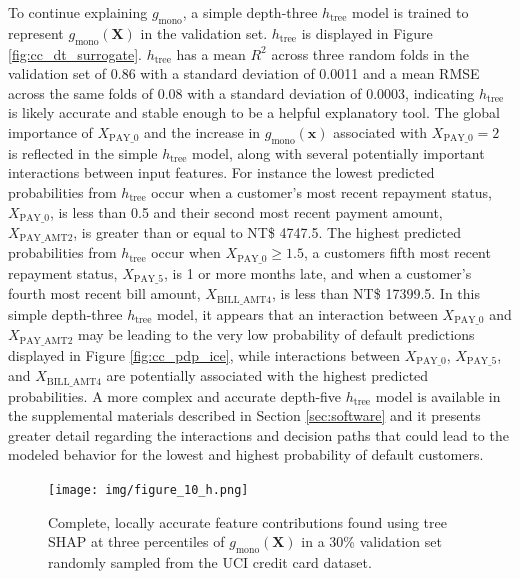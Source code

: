 \documentclass[sigconf, review]{acmart}
\begin{document}
To continue explaining $g_{\text{mono}}$, a simple depth-three $h_{\text{tree}}$ model is trained to represent  $g_{\text{mono}}(\mathbf{X})$ in the validation set. $h_{\text{tree}}$ is displayed in Figure \ref{fig:cc_dt_surrogate}. $h_{\text{tree}}$ has a mean $R^2$ across three random folds in the validation set of 0.86 with a standard deviation of 0.0011 and a mean RMSE across the same folds of 0.08 with a standard deviation of 0.0003, indicating $h_{\text{tree}}$ is likely accurate and stable enough to be a helpful explanatory tool. The global importance of $X_{\text{PAY\_0}}$  and the increase in $g_{\text{mono}}(\mathbf{x})$ associated with $X_{\text{PAY\_0}} = 2$ is reflected in the simple $h_{\text{tree}}$ model, along with several potentially important interactions between input features. For instance the lowest predicted probabilities from $h_{\text{tree}}$ occur when a customer's  most recent repayment status, $X_{\text{PAY\_0}}$, is less than 0.5 and their second most recent payment amount, $X_{\text{PAY\_AMT2}}$, is greater than or equal to NT\$ 4747.5. The highest predicted probabilities from $h_{\text{tree}}$ occur when $X_{\text{PAY\_0}} \geq 1.5$, a customers fifth most recent repayment status, $X_{\text{PAY\_5}}$, is 1 or more months late, and when a customer's fourth most recent bill amount, $X_{\text{BILL\_AMT4}}$, is less than NT\$ 17399.5. In this simple depth-three $h_{\text{tree}}$ model, it appears that an interaction between $X_{\text{PAY\_0}}$ and $X_{\text{PAY\_AMT2}}$ may be leading to the very low probability of default predictions displayed in Figure \ref{fig:cc_pdp_ice}, while interactions between $X_{\text{PAY\_0}}$, $X_{\text{PAY\_5}}$, and $X_{\text{BILL\_AMT4}}$ are potentially associated with the highest predicted probabilities. A more complex and accurate depth-five $h_{\text{tree}}$ model is available in the supplemental materials described in Section \ref{sec:software} and it presents greater detail regarding the interactions and decision paths that could lead to the modeled behavior for the lowest and highest probability of default customers. 
 
\begin{figure}[htb]
	\begin{center}
		\texttt{[image: img/figure\_10\_h.png]}
		\caption{Complete, locally accurate feature contributions found using tree SHAP at three percentiles of $g_{\text{mono}}(\mathbf{X})$ in a 30\% validation set randomly sampled from the UCI credit card dataset.}
		\label{fig:cc_shap}
	\end{center}
\end{figure}
\end{document}
